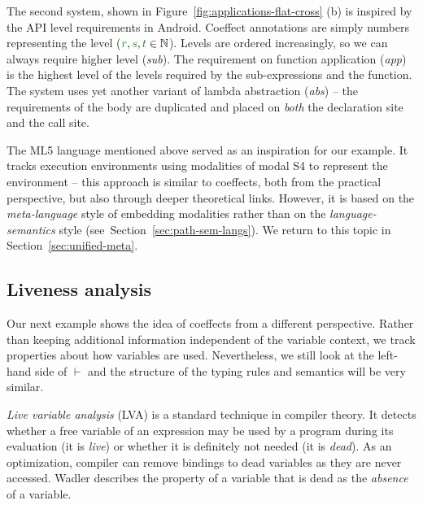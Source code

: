 The second system, shown in Figure~\ref{fig:applications-flat-cross} (b) is inspired by the API
level requirements in Android. Coeffect annotations are simply numbers representing the level
($\cclrd{r}, \cclrd{s}, \cclrd{t} \in \mathbb{N}$). Levels are ordered increasingly, so we can
always require higher level (\emph{sub}). The requirement on function application (\emph{app}) is
the highest level of the levels required by the sub-expressions and the function. The system uses 
yet another variant of lambda abstraction (\emph{abs}) -- the requirements of the body are duplicated
and placed on \emph{both} the declaration site and the call site.

The ML5 language \cite{app-distributed-ml5} mentioned above served as an inspiration for our example.
It tracks execution environments using modalities of modal S4 to represent the environment -- this 
approach is similar to coeffects, both from the practical perspective, but also through deeper 
theoretical links. However, it is based on the \emph{meta-language} style of embedding modalities
rather than on the \emph{language-semantics} style (see~Section~\ref{sec:path-sem-langs}). We 
return to this topic in Section~\ref{sec:unified-meta}.


\subsection{Liveness analysis}
\label{sec:applications-flat-live}
Our next example shows the idea of coeffects from a different perspective. Rather than
keeping additional information independent of the variable context, we track properties about how
variables are used. Nevertheless, we still look at the left-hand side of $\vdash$ and the structure
of the typing rules and semantics will be very similar.

\emph{Live variable analysis} (LVA) \cite{app-modern-compiler} is a standard technique in compiler 
theory. It detects whether a free variable of an expression may be used by a program during its
evaluation (it is \emph{live}) or whether it is definitely not needed (it is \emph{dead}). As an 
optimization, compiler can remove bindings to dead variables as they are never accessed. Wadler 
\cite{app-strictness-absecnce} describes the property of a variable that is dead as the 
\emph{absence} of a variable. 

